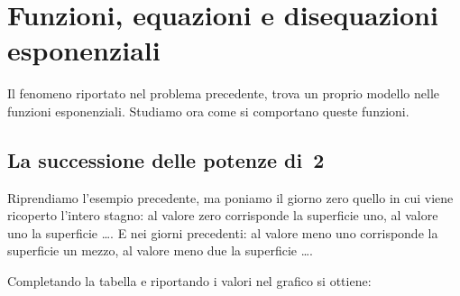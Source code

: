 \section{Funzioni, equazioni e disequazioni esponenziali}
\label{sec:esplog_esponenziali}

Il fenomeno riportato nel problema precedente, trova un proprio modello nelle 
funzioni esponenziali. Studiamo ora come si comportano queste funzioni.

\subsection{La successione delle potenze di~2}
\label{subsec:esplog_succpotdue}

Riprendiamo l'esempio precedente, ma poniamo il giorno zero quello in cui viene 
ricoperto l'intero stagno: al valore zero corrisponde la superficie uno, al 
valore uno la superficie \dots. E nei giorni precedenti: al valore meno uno 
corrisponde la superficie un mezzo, al valore meno due la superficie \dots.

Completando la tabella e riportando i valori nel grafico si ottiene:

